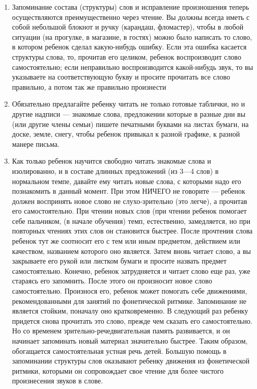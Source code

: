 \documentclass[a5paper]{book}
\begin{document}
\begin{enumerate}
\def\labelenumi{\arabic{enumi}.}
\setcounter{enumi}{1}
\item
  
  Запоминание состава (структуры) слов и исправление произношения теперь
  осуществляются преимущественно через чтение. Вы должны всегда иметь с
  собой небольшой блокнот и ручку (карандаш, фломастер), чтобы в любой
  ситуации (на прогулке, в магазине, в гостях) можно было написать то
  слово, в котором ребенок сделал какую-нибудь ошибку. Если эта ошибка
  касается структуры слова, то, прочитав его целиком, ребенок
  воспроизводит слово самостоятельно; если неправильно воспроизводится
  какой-нибудь звук, то вы указываете на соответствующую букву и просите
  прочитать все слово правильно, а потом так же правильно произнести
  
\item
  
  Обязательно предлагайте ребенку читать не только готовые таблички, но
  и другие надписи --- знакомые слова, предложении которые в разные дни
  вы (или другие члены семьи) пишете печатными буквами на листах бумаги,
  на доске, земле, снегу, чтобы ребенок привыкал к разной графике, к
  разной манере письма.
  
\item
  
  Как только ребенок научится свободно читать знакомые слова и
  изолированно, и в составе длинных предложений (из 3---4 слов) в
  нормальном темпе, давайте ему читать новые слова, с которыми надо его
  познакомить в данный момент. При этом НИЧЕГО не говорите --- ребенок
  должен воспринять новое слово не слухо-зрительно (это легче), а
  прочитав его самостоятельно. При чтении новых слов (при чтении ребенок
  помогает себе пальчиком, (в начале обучения) темп, естественно,
  замедляется, но при повторных чтениях этих слов он становится быстрее.
  После прочтения слова ребенок тут же соотносит его с тем или иным
  предметом, действием или качеством, названием которого оно является.
  Затем вновь читает слово, а вы закрываете его рукой или листком бумаги
  и просите назвать предмет самостоятельно. Конечно, ребенок
  затрудняется и читает слово еще раз, уже стараясь его запомнить. После
  этого он произносит новое слово самостоятельно. Произнося его, ребенок
  может помогать себе движениями, рекомендованными для занятий по
  фонетической ритмике. Запоминание не является стойким, поначалу оно
  кратковременно. В следующий раз ребенку придется снова прочитать это
  слово, прежде чем сказать его самостоятельно. Но со временем
  зрительно-речедвигательная память развивается, и он начинает
  запоминать новый материал значительно быстрее. Таким образом,
  обогащается самостоятельная устная речь детей. Большую помощь в
  запоминании структуры слов оказывают ребенку движения из фонетической
  ритмики, которыми он сопровождает свое чтение для более чистого
  произнесения звуков в слове.
  
\end{enumerate}
\end{document}
